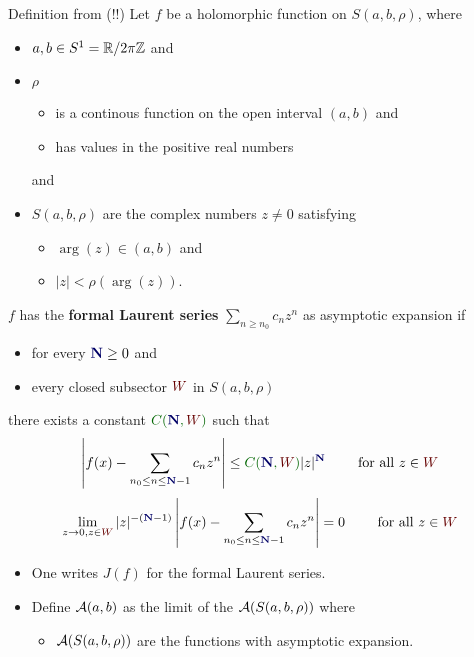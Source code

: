{
  \begin{frame}[t]{Definition from \cite{van2003galois} (!!)}
    Let $f$ be a holomorphic function on $S(a,b,\rho)$, where
    \begin{itemize}
      \item $a,b\in S^1=\mathbb{R}/2\pi\mathbb{Z}$ and
      \item $\rho$
        \begin{itemize}
          \item is a continous function on the open interval $(a,b)$ and
          \item has values in the positive real numbers
        \end{itemize}
        and
      \item $S(a,b,\rho)$ are the complex numbers $z\neq0$ satisfying
        \begin{itemize}
          \item $\arg(z)\in(a,b)$ and
          \item $|z|<\rho(\arg(z))$.
        \end{itemize}
    \end{itemize}
    \begin{defn}[7.1]
      \def\myN{\textbf{\textcolor{blue!40!black}{N}}}
      \def\mySect{\textcolor{red!40!black}{W}}
      \def\myConst{\textcolor{green!40!black}{C(\myN,\mySect)}}
      $f$ has the \textbf{formal Laurent series} $\sum_{n\geq n_0}c_nz^n$ as
      asymptotic expansion if
      \begin{itemize}
        \item for every $\myN\geq0$ and
        \item every closed subsector $\mySect$ in $S(a,b,\rho)$
      \end{itemize}
      there exists a constant $\myConst$ such that
      \[
        \left|
          f(x)-\sum_{n_0\leq n\leq \myN-1}c_nz^n
        \right|
        \leq \myConst|z|^{\myN} \qquad \text{ for all } z\in \mySect
      \]
      \Leftrightarrow{}
      \[
        \lim_{z\to0,z\in{\mySect}}
        |z|^{-(\myN-1)}
        \left|
          f(x)-\sum_{n_0\leq n\leq \myN-1}c_nz^n
        \right|=0
        \qquad \text{ for all } z\in \mySect
      \]
    \end{defn}
    \begin{itemize}
      \item One writes $J(f)$ for the formal Laurent series.
      \item Define $\mathcal{A}(a,b)$ as the limit of the $\mathcal{A}(S(a,b,\rho))$ where
        \begin{itemize}
          \item $\mathcal{A}(S(a,b,\rho))$ are the functions with asymptotic expansion.
        \end{itemize}
    \end{itemize}
  \end{frame}

}
